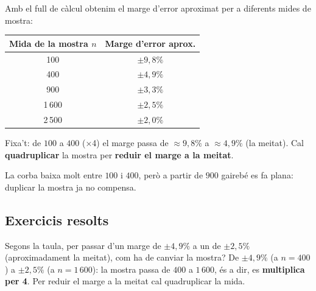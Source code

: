 \begin{exemple}
Amb el full de càlcul obtenim el marge d'error aproximat per a diferents mides de mostra:
\begin{center}
\renewcommand{\arraystretch}{1.2}
\begin{tabular}{c c}
\toprule
\textbf{Mida de la mostra $n$} & \textbf{Marge d'error aprox.} \\
\midrule
100  & $\pm 9,8\%$ \\
400  & $\pm 4,9\%$ \\
900  & $\pm 3,3\%$ \\
1\,600 & $\pm 2,5\%$ \\
2\,500 & $\pm 2,0\%$ \\
\bottomrule
\end{tabular}
\end{center}
Fixa't: de $100$ a $400$ (×4) el marge passa de $\approx 9,8\%$ a $\approx 4,9\%$ (la
meitat). Cal \textbf{quadruplicar} la mostra per \textbf{reduir el marge a la meitat}.
\end{exemple}

\begin{exemple}
\begin{center}

\end{center}
La corba baixa molt entre $100$ i $400$, però a partir de $900$ gairebé es fa plana:
duplicar la mostra ja no compensa.
\end{exemple}

\subsection{Exercicis resolts}

\begin{exresolt}
Segons la taula, per passar d'un marge de $\pm 4,9\%$ a un de $\pm 2,5\%$ (aproximadament la
meitat), com ha de canviar la mostra?
\solucio
De $\pm 4,9\%$ (a $n=400$) a $\pm 2,5\%$ (a $n=1\,600$): la mostra passa de $400$ a
$1\,600$, és a dir, es \textbf{multiplica per 4}. Per reduir el marge a la meitat cal
quadruplicar la mida.
\end{exresolt}

